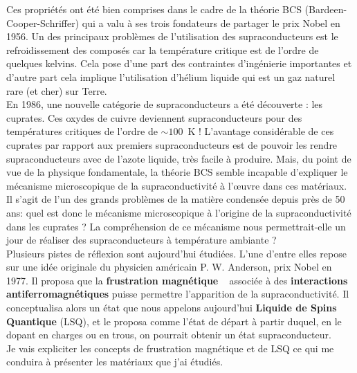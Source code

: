 Ces propriétés ont été bien comprises dans le cadre de la théorie BCS (Bardeen-Cooper-Schriffer) qui a valu à ses trois fondateurs de partager le prix Nobel en 1956. 
Un des principaux problèmes de l'utilisation des supraconducteurs est le refroidissement des composés car la température critique est de l'ordre de quelques kelvins. Cela pose d'une part des contraintes d'ingénierie importantes et d'autre part cela implique l'utilisation d'hélium liquide qui est un gaz naturel rare (et cher) sur Terre.\\
En 1986, une nouvelle catégorie de supraconducteurs a été découverte : les cuprates. Ces oxydes de cuivre deviennent supraconducteurs pour des températures critiques de l'ordre de $\sim100$~K  ! L'avantage considérable de ces cuprates par rapport aux premiers supraconducteurs est de pouvoir les rendre supraconducteurs avec de l'azote liquide, très facile à produire. Mais, du point de vue de la physique fondamentale, la théorie BCS semble incapable d'expliquer le mécanisme microscopique de la supraconductivité à l'\oe uvre dans ces matériaux. Il s'agit de l'un des grands problèmes de la matière condensée depuis près de 50 ans: quel est donc le mécanisme microscopique à l'origine de la supraconductivité dans les cuprates ? La compréhension de ce mécanisme nous permettrait-elle un jour de réaliser des supraconducteurs à température ambiante ?\\
Plusieurs pistes de réflexion sont aujourd'hui étudiées. L'une d'entre elles repose sur une idée originale du physicien américain P. W. Anderson, prix Nobel en 1977. Il proposa que la \og \textbf{frustration magnétique} \fg ~ associée à des \textbf{interactions antiferromagnétiques} puisse permettre l'apparition de la supraconductivité. Il conceptualisa alors un état que nous appelons aujourd'hui \og \textbf{Liquide de Spins Quantique} \fg (LSQ), et le proposa comme l'état de départ à partir duquel, en le dopant en charges ou en trous, on pourrait obtenir un état supraconducteur.\\
Je vais expliciter les concepts de frustration magnétique et de LSQ ce qui me conduira à présenter les matériaux que j'ai étudiés.



